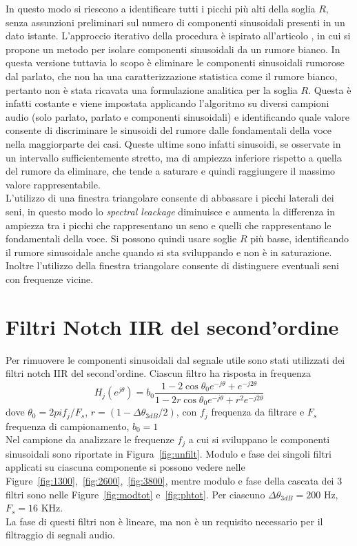 \documentclass[10pt,A4]{article}
\begin{document}
In questo modo si riescono a identificare tutti i picchi più alti della soglia $R$, senza assunzioni preliminari sul numero di componenti sinusoidali presenti in un dato istante. L'approccio iterativo della procedura è ispirato all'articolo \cite{iterative}, in cui si propone un metodo per isolare componenti sinusoidali da un rumore bianco. In questa versione tuttavia lo scopo è eliminare le componenti sinusoidali rumorose dal parlato, che non ha una caratterizzazione statistica come il rumore bianco, pertanto non è stata ricavata una formulazione analitica per la soglia $R$. Questa è infatti costante e viene impostata applicando l'algoritmo su diversi campioni audio (solo parlato, parlato e componenti sinusoidali) e identificando quale valore consente di discriminare le sinusoidi del rumore dalle fondamentali della voce nella maggiorparte dei casi. Queste ultime sono infatti sinusoidi, se osservate in un intervallo sufficientemente stretto, ma di ampiezza inferiore rispetto a quella del rumore da eliminare, che tende a saturare e quindi raggiungere il massimo valore rappresentabile. \\
L'utilizzo di una finestra triangolare consente di abbassare i picchi laterali dei seni, in questo modo lo \textit{spectral leackage} diminuisce e aumenta la differenza in ampiezza tra i picchi che rappresentano un seno e quelli che rappresentano le fondamentali della voce. Si possono quindi usare soglie $R$ più basse, identificando il rumore sinusoidale anche quando si sta sviluppando e non è in saturazione. Inoltre l'utilizzo della finestra triangolare consente di distinguere eventuali seni con frequenze vicine. \\


\section{Filtri Notch IIR del second'ordine}
Per rimuovere le componenti sinusoidali dal segnale utile sono stati utilizzati dei filtri notch IIR del second'ordine.
Ciascun filtro ha risposta in frequenza
\begin{equation}
  H_j(e^{j\theta}) = b_0 \frac{1 - 2\cos\theta_0 e^{-j\theta} + e^{-j2\theta}}{1 - 2 r \cos\theta_0 e^{-j\theta} + r^2 e^{-j2\theta}}
\end{equation}
dove $\theta_0 = 2pif_j/F_s$, $r = (1 - \Delta\theta_{3dB} / 2)$, con $f_j$ frequenza da filtrare e $F_s$ frequenza di campionamento, $b_0 = 1$ \\
Nel campione da analizzare le frequenze $f_j$ a cui si sviluppano le componenti sinusoidali sono riportate in Figura~\ref{fig:unfilt}. Modulo e fase dei singoli filtri applicati su ciascuna componente si possono vedere nelle Figure~\ref{fig:1300},~\ref{fig:2600},~\ref{fig:3800}, mentre modulo e fase della cascata dei 3 filtri sono nelle Figure~\ref{fig:modtot} e~\ref{fig:phtot}. Per ciascuno $\Delta\theta_{3dB} = 200 $ Hz, $ F_s = 16 $ KHz. \\
La fase di questi filtri non è lineare, ma non è un requisito necessario per il filtraggio di segnali audio. \\
\end{document}
